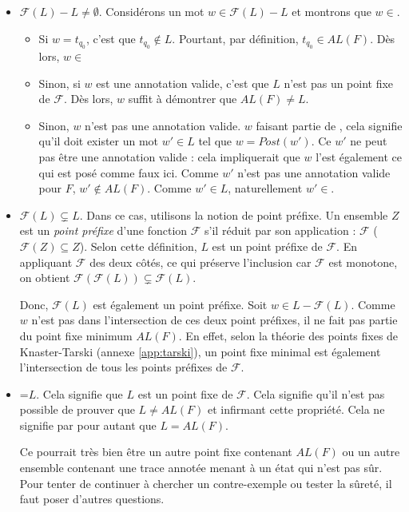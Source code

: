 \begin{itemize}
  \item $\mathcal{F}(L)-L\neq\emptyset$. Considérons un mot $w\in\mathcal{F}(L)-L$ et montrons que $w\in$\alfx.
  \begin{itemize}
    \item Si $w=t_{q_0}$, c'est que $t_{q_0}\notin L$. Pourtant, par définition, $t_{q_0}\in AL(F)$. Dès lors, $w\in$\alfx
    \item Sinon, si $w$ est une annotation valide, c'est que $L$ n'est pas un point fixe de $\mathcal{F}$. Dès lors, $w$ suffit à démontrer que $AL(F)\neq L$.
    \item Sinon, $w$ n'est pas une annotation valide. $w$ faisant partie de \fl, cela signifie qu'il doit exister un mot $w'\in L$ tel que $w=Post(w')$. Ce $w'$ ne peut pas être une annotation valide : cela impliquerait que $w$ l'est également ce qui est posé comme faux ici. Comme $w'$ n'est pas une annotation valide pour $F$, $w'\notin AL(F)$. Comme $w'\in L$, naturellement $w'\in$\alfx.
  \end{itemize}
  \item $\mathcal{F}(L)\subsetneq L$. Dans ce cas, utilisons la notion de point préfixe. Un ensemble $Z$ est un \emph{point préfixe} d'une fonction $\mathcal{F}$ s'il réduit par son application : $\mathcal{F}$ ($\mathcal{F}(Z)\subseteq Z$). Selon cette définition, $L$ est un point préfixe de $\mathcal{F}$.
  En appliquant $\mathcal{F}$ des deux côtés, ce qui préserve l'inclusion car $\mathcal{F}$ est monotone, on obtient $\mathcal{F}(\mathcal{F}(L))\subsetneq\mathcal{F}(L)$.

  Donc, $\mathcal{F}(L)$ est également un point préfixe. Soit $w\in L-\mathcal{F}(L)$. Comme $w$ n'est pas dans l'intersection de ces deux point préfixes, il ne fait pas partie du point fixe minimum $AL(F)$. En effet, selon la théorie des points fixes de Knaster-Tarski (annexe \ref{app:tarski}), un point fixe minimal est également l'intersection de tous les points préfixes de $\mathcal{F}$.

  \item \fl=$L$. Cela signifie que $L$ est un point fixe de $\mathcal{F}$. Cela signifie qu'il n'est pas possible de prouver que $L\neq AL(F)$ et infirmant cette propriété. Cela ne signifie par pour autant que $L=AL(F)$.

  Ce pourrait très bien être un autre point fixe contenant $AL(F)$ ou un autre ensemble contenant une trace annotée menant à un état qui n'est pas sûr. Pour tenter de continuer à chercher un contre-exemple ou tester la sûreté, il faut poser d'autres questions.

\end{itemize}



